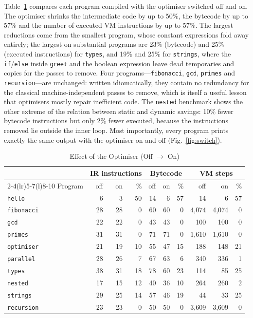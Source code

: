 \documentclass[conference]{IEEEtran}
\newcommand{\code}[1]{\texttt{#1}}
\begin{document}
Table~\ref{tab:onoff} compares each program compiled with the optimiser switched off and on. The optimiser shrinks the intermediate code by up to 50\%, the bytecode by up to 57\% and the number of executed VM instructions by up to 57\%. The largest reductions come from the smallest program, whose constant expressions fold away entirely; the largest on substantial programs are 23\% (bytecode) and 25\% (executed instructions) for \code{types}, and 19\% and 25\% for \code{strings}, where the \code{if}/\code{else} inside \code{greet} and the boolean expression leave dead temporaries and copies for the passes to remove. Four programs---\code{fibonacci}, \code{gcd}, \code{primes} and \code{recursion}---are unchanged: written idiomatically, they contain no redundancy for the classical machine-independent passes to remove, which is itself a useful lesson that optimisers mostly repair inefficient code. The \code{nested} benchmark shows the other extreme of the relation between static and dynamic savings: 10\% fewer bytecode instructions but only 2\% fewer executed, because the instructions removed lie outside the inner loop. Most importantly, every program prints exactly the same output with the optimiser on and off (Fig.~\ref{fig:switch}).

\begin{table}[!tbp]
\caption{Effect of the Optimiser (Off $\to$ On)}
\label{tab:onoff}
\centering
\footnotesize
\setlength{\tabcolsep}{2.6pt}
\begin{tabular}{@{}l r r r r r r r r r@{}}
\toprule
& \multicolumn{3}{c}{IR instructions} & \multicolumn{3}{c}{Bytecode} & \multicolumn{3}{c}{VM steps} \\
\cmidrule(lr){2-4}\cmidrule(lr){5-7}\cmidrule(l){8-10}
Program & off & on & \% & off & on & \% & off & on & \% \\
\midrule
\code{hello} & 6 & 3 & 50 & 14 & 6 & 57 & 14 & 6 & 57 \\
\code{fibonacci} & 28 & 28 & 0 & 60 & 60 & 0 & 4,074 & 4,074 & 0 \\
\code{gcd} & 22 & 22 & 0 & 43 & 43 & 0 & 100 & 100 & 0 \\
\code{primes} & 31 & 31 & 0 & 71 & 71 & 0 & 1,610 & 1,610 & 0 \\
\code{optimiser} & 21 & 19 & 10 & 55 & 47 & 15 & 188 & 148 & 21 \\
\code{parallel} & 28 & 26 & 7 & 67 & 63 & 6 & 340 & 336 & 1 \\
\code{types} & 38 & 31 & 18 & 78 & 60 & 23 & 114 & 85 & 25 \\
\code{nested} & 17 & 15 & 12 & 40 & 36 & 10 & 264 & 260 & 2 \\
\code{strings} & 29 & 25 & 14 & 57 & 46 & 19 & 44 & 33 & 25 \\
\code{recursion} & 23 & 23 & 0 & 50 & 50 & 0 & 3,609 & 3,609 & 0 \\
\bottomrule
\end{tabular}
\end{table}
\end{document}
